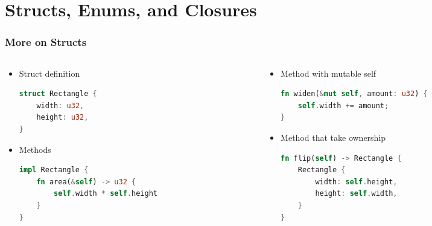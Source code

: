  \section{Structs, Enums, and Closures}

\begin{frame}[fragile]
    \frametitle{More on Structs}

    \begin{columns}
    \begin{column}{0.5\textwidth}

    \begin{itemize}
        \item<1-> Struct definition
        \begin{lstlisting}[language=rust]
struct Rectangle {
    width: u32,
    height: u32,
}
        \end{lstlisting}

        \item<2-> Methods
        \begin{lstlisting}[language=rust]
impl Rectangle {
    fn area(&self) -> u32 {
        self.width * self.height
    }
}
        \end{lstlisting}
    \end{itemize}

    \end{column}
    \begin{column}{0.5\textwidth}

    \begin{itemize}
        \item<3-> Method with mutable self
        \begin{lstlisting}[language=rust]
fn widen(&mut self, amount: u32) {
    self.width += amount;
}
        \end{lstlisting}

        \item<4-> Method that take ownership
        \begin{lstlisting}[language=rust]
fn flip(self) -> Rectangle {
    Rectangle {
        width: self.height,
        height: self.width,
    }
}
        \end{lstlisting}
    \end{itemize}

    \end{column}
    \end{columns}
\end{frame}

